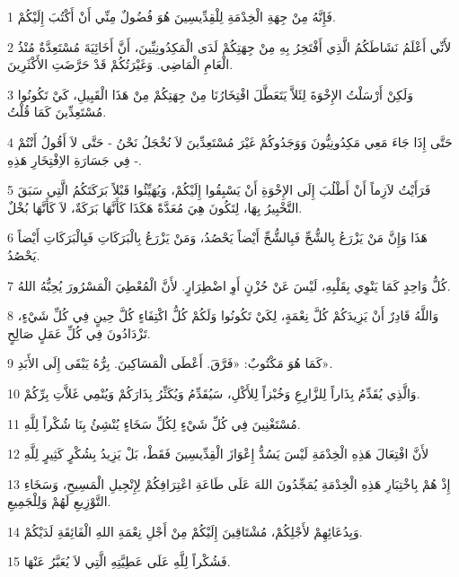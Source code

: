 \par 1 فَإِنَّهُ مِنْ جِهَةِ الْخِدْمَةِ لِلْقِدِّيسِينَ هُوَ فُضُولٌ مِنِّي أَنْ أَكْتُبَ إِلَيْكُمْ.
\par 2 لأَنِّي أَعْلَمُ نَشَاطَكُمُ الَّذِي أَفْتَخِرُ بِهِ مِنْ جِهَتِكُمْ لَدَى الْمَكِدُونِيِّينَ، أَنَّ أَخَائِيَةَ مُسْتَعِدَّةٌ مُنْذُ الْعَامِ الْمَاضِي. وَغَيْرَتُكُمْ قَدْ حَرَّضَتِ الأَكْثَرِينَ.
\par 3 وَلَكِنْ أَرْسَلْتُ الإِخْوَةَ لِئَلاَّ يَتَعَطَّلَ افْتِخَارُنَا مِنْ جِهَتِكُمْ مِنْ هَذَا الْقَبِيلِ، كَيْ تَكُونُوا مُسْتَعِدِّينَ كَمَا قُلْتُ.
\par 4 حَتَّى إِذَا جَاءَ مَعِي مَكِدُونِيُّونَ وَوَجَدُوكُمْ غَيْرَ مُسْتَعِدِّينَ لاَ نُخْجَلُ نَحْنُ - حَتَّى لاَ أَقُولُ أَنْتُمْ - فِي جَسَارَةِ الاِفْتِخَارِ هَذِهِ.
\par 5 فَرَأَيْتُ لاَزِماً أَنْ أَطْلُبَ إِلَى الإِخْوَةِ أَنْ يَسْبِقُوا إِلَيْكُمْ، وَيُهَيِّئُوا قَبْلاً بَرَكَتَكُمُ الَّتِي سَبَقَ التَّخْبِيرُ بِهَا، لِتَكُونَ هِيَ مُعَدَّةً هَكَذَا كَأَنَّهَا بَرَكَةٌ، لاَ كَأَنَّهَا بُخْلٌ.
\par 6 هَذَا وَإِنَّ مَنْ يَزْرَعُ بِالشُّحِّ فَبِالشُّحِّ أَيْضاً يَحْصُدُ، وَمَنْ يَزْرَعُ بِالْبَرَكَاتِ فَبِالْبَرَكَاتِ أَيْضاً يَحْصُدُ.
\par 7 كُلُّ وَاحِدٍ كَمَا يَنْوِي بِقَلْبِهِ، لَيْسَ عَنْ حُزْنٍ أَوِ اضْطِرَارٍ. لأَنَّ الْمُعْطِيَ الْمَسْرُورَ يُحِبُّهُ اللهُ.
\par 8 وَاللَّهُ قَادِرٌ أَنْ يَزِيدَكُمْ كُلَّ نِعْمَةٍ، لِكَيْ تَكُونُوا وَلَكُمْ كُلُّ اكْتِفَاءٍ كُلَّ حِينٍ فِي كُلِّ شَيْءٍ، تَزْدَادُونَ فِي كُلِّ عَمَلٍ صَالِحٍ.
\par 9 كَمَا هُوَ مَكْتُوبٌ: «فَرَّقَ. أَعْطَى الْمَسَاكِينَ. بِرُّهُ يَبْقَى إِلَى الأَبَدِ».
\par 10 وَالَّذِي يُقَدِّمُ بِذَاراً لِلزَّارِعِ وَخُبْزاً لِلأَكْلِ، سَيُقَدِّمُ وَيُكَثِّرُ بِذَارَكُمْ وَيُنْمِي غَلاَّتِ بِرِّكُمْ.
\par 11 مُسْتَغْنِينَ فِي كُلِّ شَيْءٍ لِكُلِّ سَخَاءٍ يُنْشِئُ بِنَا شُكْراً لِلَّهِ.
\par 12 لأَنَّ افْتِعَالَ هَذِهِ الْخِدْمَةِ لَيْسَ يَسُدُّ إِعْوَازَ الْقِدِّيسِينَ فَقَطْ، بَلْ يَزِيدُ بِشُكْرٍ كَثِيرٍ لِلَّهِ
\par 13 إِذْ هُمْ بِاخْتِبَارِ هَذِهِ الْخِدْمَةِ يُمَجِّدُونَ اللهَ عَلَى طَاعَةِ اعْتِرَافِكُمْ لِإِنْجِيلِ الْمَسِيحِ، وَسَخَاءِ التَّوْزِيعِ لَهُمْ وَلِلْجَمِيعِ.
\par 14 وَبِدُعَائِهِمْ لأَجْلِكُمْ، مُشْتَاقِينَ إِلَيْكُمْ مِنْ أَجْلِ نِعْمَةِ اللهِ الْفَائِقَةِ لَدَيْكُمْ.
\par 15 فَشُكْراً لِلَّهِ عَلَى عَطِيَّتِهِ الَّتِي لاَ يُعَبَّرُ عَنْهَا.

